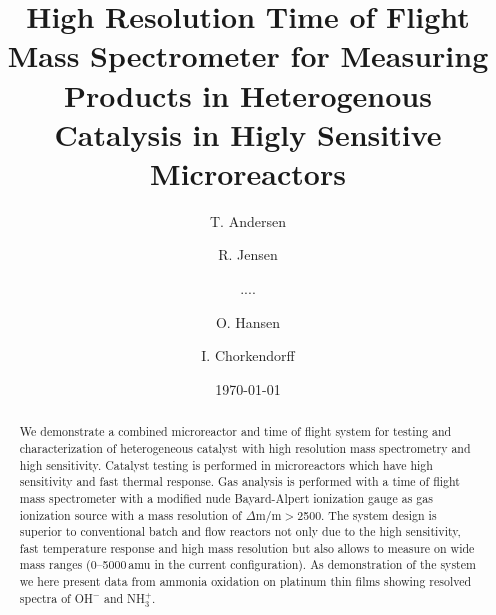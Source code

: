 \documentclass[aip,rsi]{revtex4-1}
\begin{document}

\title{High Resolution Time of Flight Mass Spectrometer for Measuring Products in Heterogenous Catalysis in Higly Sensitive Microreactors} %



\author{T. Andersen}
\author{R. Jensen}
\author{....}
\author{O. Hansen}
\author{I. Chorkendorff}


\date{\today}

\begin{abstract}
We demonstrate a combined microreactor and time of flight system for testing and characterization of heterogeneous catalyst with high resolution mass spectrometry and high sensitivity. Catalyst testing is performed in microreactors which have high sensitivity and fast thermal response. Gas analysis is performed with a time of flight mass spectrometer with a modified nude Bayard-Alpert ionization gauge as gas ionization source with a mass resolution of $\Delta$m/m$>$2500. The system design is superior to conventional batch and flow reactors not only due to the high sensitivity, fast temperature response and high mass resolution but also allows to measure on wide mass ranges (0--5000\,amu in the current configuration). As demonstration of the system we here present data from ammonia oxidation on platinum thin films showing resolved spectra of OH$^{-}$ and NH$_{3}^{+}$.
\end{abstract}
\end{document}
